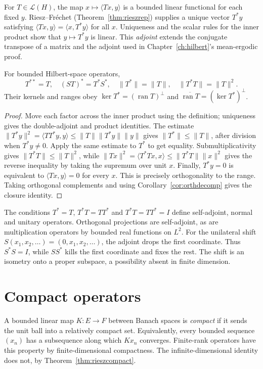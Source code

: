 For $T\in\mathcal L(H)$, the map $x\mapsto\langle Tx,y\rangle$ is a bounded linear functional for each fixed $y$. Riesz--Fr\'echet (Theorem~\ref{thm:rieszrep}) supplies a unique vector $T^*y$ satisfying
$\langle Tx,y\rangle=\langle x,T^*y\rangle$ for all $x$.
Uniqueness and the scalar rules for the inner product show that $y\mapsto T^*y$ is linear. This \emph{adjoint} extends the conjugate transpose of a matrix and the adjoint used in Chapter~\ref{ch:hilbert}'s mean-ergodic proof.

\begin{proposition}\label{prop:adjoint}
For bounded Hilbert-space operators,
\[
T^{**}=T,\quad (ST)^*=T^*S^*,\quad
\|T^*\|=\|T\|,\quad \|T^*T\|=\|T\|^2.
\]
Their kernels and ranges obey
$\ker T^*=(\operatorname{ran}T)^\perp$ and
$\overline{\operatorname{ran}T}=(\ker T^*)^\perp$.
\end{proposition}
\begin{proof}
Move each factor across the inner product using the definition; uniqueness gives the double-adjoint and product identities. The estimate
$\|T^*y\|^2=\langle TT^*y,y\rangle\le\|T\|\|T^*y\|\|y\|$
gives $\|T^*\|\le\|T\|$, after division when $T^*y\ne0$. Apply the same estimate to $T^*$ to get equality. Submultiplicativity gives $\|T^*T\|\le\|T\|^2$, while
$\|Tx\|^2=\langle T^*Tx,x\rangle\le\|T^*T\|\|x\|^2$
gives the reverse inequality by taking the supremum over unit $x$.
Finally, $T^*y=0$ is equivalent to $\langle Tx,y\rangle=0$ for every $x$. This is precisely orthogonality to the range. Taking orthogonal complements and using Corollary~\ref{cor:orthdecomp} gives the closure identity.
\end{proof}

The conditions $T^*=T$, $T^*T=TT^*$ and $T^*T=TT^*=I$ define self-adjoint, normal and unitary operators. Orthogonal projections are self-adjoint, as are multiplication operators by bounded real functions on $L^2$. For the unilateral shift
$S(x_1,x_2,\ldots)=(0,x_1,x_2,\ldots)$,
the adjoint drops the first coordinate. Thus $S^*S=I$, while $SS^*$ kills the first coordinate and fixes the rest. The shift is an isometry onto a proper subspace, a possibility absent in finite dimension.

\section{Compact operators}

A bounded linear map $K:E\to F$ between Banach spaces is \emph{compact} if it sends the unit ball into a relatively compact set. Equivalently, every bounded sequence $(x_n)$ has a subsequence along which $Kx_n$ converges. Finite-rank operators have this property by finite-dimensional compactness. The infinite-dimensional identity does not, by Theorem~\ref{thm:rieszcompact}.

